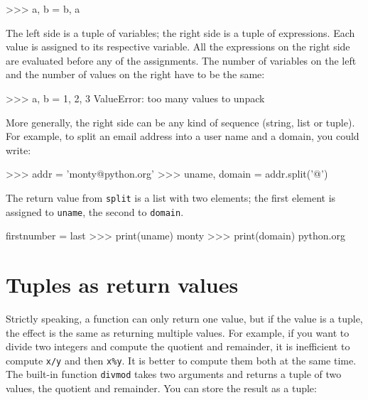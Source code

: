 \beforeverb
\begin{pycode}
>>> a, b = b, a
\end{pycode}
\afterverb
%
The left side is a tuple of variables; the right side is a tuple of
expressions.  Each value is assigned to its respective variable.  
All the expressions on the right side are evaluated before any
of the assignments.
%
The number of variables on the left and the number of
values on the right have to be the same:


\beforeverb
\begin{pycode}
>>> a, b = 1, 2, 3
ValueError: too many values to unpack
\end{pycode}
\afterverb
%
More generally, the right side can be any kind of sequence
(string, list or tuple).  For example, to split an email address
into a user name and a domain, you could write:


\beforeverb
\begin{pycode}
>>> addr = 'monty@python.org'
>>> uname, domain = addr.split('@')
\end{pycode}
\afterverb
%
The return value from {\tt split} is a list with two elements;
the first element is assigned to {\tt uname}, the second to
{\tt domain}.

\beforeverb
\begin{pycode*}{firstnumber = last}
>>> print(uname)
monty
>>> print(domain)
python.org
\end{pycode*}
\afterverb
%

\section{Tuples as return values}


Strictly speaking, a function can only return one value, but
if the value is a tuple, the effect is the same as returning
multiple values.  For example, if you want to divide two integers
and compute the quotient and remainder, it is inefficient to
compute {\tt x/y} and then {\tt x\%y}.  It is better to compute
them both at the same time.
%
%
The built-in function {\tt divmod} takes two arguments and
returns a tuple of two values, the quotient and remainder.
You can store the result as a tuple:

